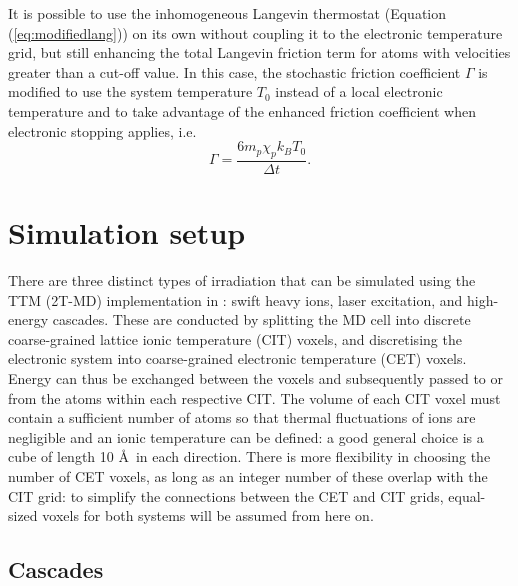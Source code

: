 It is possible to use the inhomogeneous Langevin thermostat (Equation
(\ref{eq:modifiedlang})) on its own
without coupling it to the electronic temperature grid, but still enhancing
the total Langevin friction term for atoms with velocities greater than a
cut-off value\cite{zarkadoula-13a}. In this case, the stochastic friction
coefficient $\Gamma$ is modified to use the system temperature $T_0$
instead of a local electronic temperature and to take advantage of the
enhanced friction coefficient when electronic stopping applies, i.e.
\begin{equation}
\Gamma = \frac{6 m_{p} \chi_{p} k_B T_0}{\Delta t}.
\end{equation}

\section{Simulation setup}

There are three distinct types of irradiation that can be simulated using
the TTM (2T-MD) implementation in \D: swift heavy ions, laser excitation,
and high-energy cascades. These are conducted by splitting the MD cell
into discrete coarse-grained lattice ionic temperature (CIT) voxels, and
discretising the electronic system into coarse-grained electronic
temperature (CET) voxels. Energy can thus be exchanged between the
voxels and subsequently passed to or from the atoms within each respective
CIT. The volume of each CIT voxel must contain a sufficient number of atoms
so that thermal fluctuations of ions are negligible and an ionic temperature
can be defined: a good general choice is a cube of length 10 \AA~in each
direction. There is more flexibility in choosing the number of CET voxels,
as long as an integer number of these overlap with the CIT grid: to simplify
the connections between the CET and CIT grids, equal-sized voxels for both
systems will be assumed from here on.

\subsection*{Cascades}

